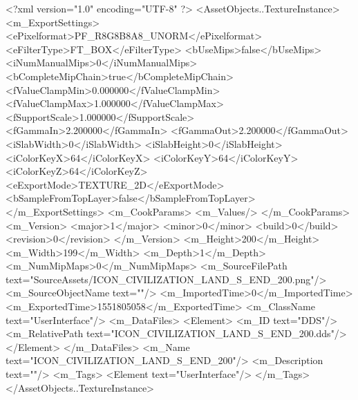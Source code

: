 <?xml version="1.0" encoding="UTF-8" ?>
<AssetObjects..TextureInstance>
	<m_ExportSettings>
		<ePixelformat>PF_R8G8B8A8_UNORM</ePixelformat>
		<eFilterType>FT_BOX</eFilterType>
		<bUseMips>false</bUseMips>
		<iNumManualMips>0</iNumManualMips>
		<bCompleteMipChain>true</bCompleteMipChain>
		<fValueClampMin>0.000000</fValueClampMin>
		<fValueClampMax>1.000000</fValueClampMax>
		<fSupportScale>1.000000</fSupportScale>
		<fGammaIn>2.200000</fGammaIn>
		<fGammaOut>2.200000</fGammaOut>
		<iSlabWidth>0</iSlabWidth>
		<iSlabHeight>0</iSlabHeight>
		<iColorKeyX>64</iColorKeyX>
		<iColorKeyY>64</iColorKeyY>
		<iColorKeyZ>64</iColorKeyZ>
		<eExportMode>TEXTURE_2D</eExportMode>
		<bSampleFromTopLayer>false</bSampleFromTopLayer>
	</m_ExportSettings>
	<m_CookParams>
		<m_Values/>
	</m_CookParams>
	<m_Version>
		<major>1</major>
		<minor>0</minor>
		<build>0</build>
		<revision>0</revision>
	</m_Version>
	<m_Height>200</m_Height>
	<m_Width>199</m_Width>
	<m_Depth>1</m_Depth>
	<m_NumMipMaps>0</m_NumMipMaps>
	<m_SourceFilePath text="SourceAssets/ICON_CIVILIZATION_LAND_S_END_200.png"/>
	<m_SourceObjectName text=""/>
	<m_ImportedTime>0</m_ImportedTime>
	<m_ExportedTime>1551805058</m_ExportedTime>
	<m_ClassName text="UserInterface"/>
	<m_DataFiles>
		<Element>
			<m_ID text="DDS"/>
			<m_RelativePath text="ICON_CIVILIZATION_LAND_S_END_200.dds"/>
		</Element>
	</m_DataFiles>
	<m_Name text="ICON_CIVILIZATION_LAND_S_END_200"/>
	<m_Description text=""/>
	<m_Tags>
		<Element text="UserInterface"/>
	</m_Tags>
</AssetObjects..TextureInstance>

